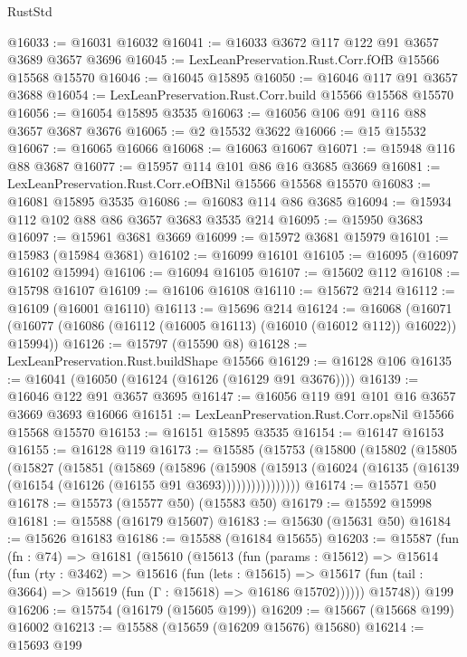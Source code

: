 \begin{lexlean}{RustStd}
\begin{coremodule}
@16033 := @16031 @16032
@16041 := @16033 @3672 @117 @122 @91 @3657 @3689 @3657 @3696
@16045 := LexLeanPreservation.Rust.Corr.fOfB @15566 @15568 @15570
@16046 := @16045 @15895
@16050 := @16046 @117 @91 @3657 @3688
@16054 := LexLeanPreservation.Rust.Corr.build @15566 @15568 @15570
@16056 := @16054 @15895 @3535
@16063 := @16056 @106 @91 @116 @88 @3657 @3687 @3676
@16065 := @2 @15532 @3622
@16066 := @15 @15532
@16067 := @16065 @16066
@16068 := @16063 @16067
@16071 := @15948 @116 @88 @3687
@16077 := @15957 @114 @101 @86 @16 @3685 @3669
@16081 := LexLeanPreservation.Rust.Corr.eOfBNil @15566 @15568 @15570
@16083 := @16081 @15895 @3535
@16086 := @16083 @114 @86 @3685
@16094 := @15934 @112 @102 @88 @86 @3657 @3683 @3535 @214
@16095 := @15950 @3683
@16097 := @15961 @3681 @3669
@16099 := @15972 @3681 @15979
@16101 := @15983 (@15984 @3681)
@16102 := @16099 @16101
@16105 := @16095 (@16097 @16102 @15994)
@16106 := @16094 @16105
@16107 := @15602 @112
@16108 := @15798 @16107
@16109 := @16106 @16108
@16110 := @15672 @214
@16112 := @16109 (@16001 @16110)
@16113 := @15696 @214
@16124 := @16068
    (@16071 (@16077 (@16086 (@16112 (@16005 @16113) (@16010 (@16012 @112)) @16022)) @15994))
@16126 := @15797 (@15590 @8)
@16128 := LexLeanPreservation.Rust.buildShape @15566
@16129 := @16128 @106
@16135 := @16041 (@16050 (@16124 (@16126 (@16129 @91 @3676))))
@16139 := @16046 @122 @91 @3657 @3695
@16147 := @16056 @119 @91 @101 @16 @3657 @3669 @3693 @16066
@16151 := LexLeanPreservation.Rust.Corr.opsNil @15566 @15568 @15570
@16153 := @16151 @15895 @3535
@16154 := @16147 @16153
@16155 := @16128 @119
@16173 := @15585
    (@15753
      (@15800
        (@15802
          (@15805
            (@15827
              (@15851
                (@15869
                  (@15896
                    (@15908
                      (@15913
                        (@16024 (@16135 (@16139 (@16154 (@16126 (@16155 @91 @3693))))))))))))))))
@16174 := @15571 @50
@16178 := @15573 (@15577 @50) (@15583 @50)
@16179 := @15592 @15998
@16181 := @15588 (@16179 @15607)
@16183 := @15630 (@15631 @50)
@16184 := @15626 @16183
@16186 := @15588 (@16184 @15655)
@16203 := @15587
    (fun (fn : @74) =>
    @16181
      (@15610
        (@15613
          (fun (params : @15612) =>
          @15614
            (fun (rty : @3462) =>
            @15616
              (fun (lets : @15615) =>
              @15617 (fun (tail : @3664) => @15619 (fun (Γ : @15618) => @16186 @15702))))))
        @15748))
    @199
@16206 := @15754 (@16179 (@15605 @199))
@16209 := @15667 (@15668 @199) @16002
@16213 := @15588 (@15659 (@16209 @15676) @15680)
@16214 := @15693 @199

\end{coremodule}
\end{lexlean}
